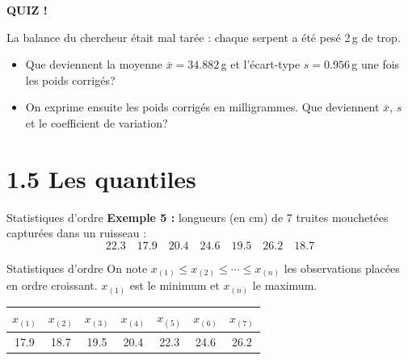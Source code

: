 \documentclass{BeamerTemplate}
\begin{document}
\begin{frame}[plain,t]
  \centerline{\LARGE\bfseries\alert{QUIZ !}}

  \medskip
  La balance du chercheur était mal tarée : chaque serpent a été pesé
  \alert{2\,g de trop}.
  \begin{itemize}\itemsep 1.2cm
    \item Que deviennent la moyenne $\overline{x} = 34.882$\,g et l'écart-type
      $s = 0.956$\,g une fois les poids corrigés?
    \item<2-> On exprime ensuite les poids corrigés en \alert{milligrammes}.
      Que deviennent $\overline{x}$, $s$ et le coefficient de variation?
  \end{itemize}
\end{frame}

\section[Quantiles]{1.5 Les quantiles}

\begin{frame}[t]{Statistiques d'ordre}
  \textbf{Exemple 5 :} longueurs (en cm) de 7 truites mouchetées capturées
  dans un ruisseau :
  \[ 22.3 \quad 17.9 \quad 20.4 \quad 24.6 \quad 19.5 \quad 26.2 \quad 18.7 \]

  \begin{Boite}{Statistiques d'ordre}
    On note $x_{(1)} \le x_{(2)} \le \cdots \le x_{(n)}$ les observations
    placées en \alert{ordre croissant}. $x_{(1)}$ est le minimum et $x_{(n)}$
    le maximum.
  \end{Boite}


  \begin{center}
  \begin{tabular}{ccccccc}
    $x_{(1)}$ & $x_{(2)}$ & $x_{(3)}$ & $x_{(4)}$ & $x_{(5)}$ & $x_{(6)}$ & $x_{(7)}$ \\
    \midrule
    17.9 & 18.7 & 19.5 & 20.4 & 22.3 & 24.6 & 26.2 \\
  \end{tabular}
  \end{center}

\end{frame}
\end{document}
